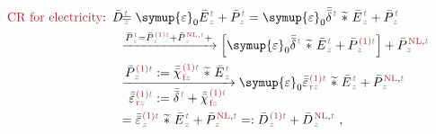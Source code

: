 \begin{subequations} \label{eq:cr-d}
\begin{align}
	\textcolor{Maroon}{\text{CR for electricity}}\text{:}&\hspace{0.5em} \bar{D}^{\;\!\textcolor{gray}{t}}_{\;\!\textcolor{gray}{z}} \hspace{-2.0em} &&= {\symup{\varepsilon}}_0 \bar{E}^{\;\!\textcolor{gray}{t}}_{\;\!\textcolor{gray}{z}} + \bar{P}^{\;\!\textcolor{gray}{t}}_{\;\!\textcolor{gray}{z}} = {\symup{\varepsilon}}_0 \bar{\bar{\delta}}^{\;\!\textcolor{gray}{t}}~\widetilde *~\bar{E}^{\;\!\textcolor{gray}{t}}_{\;\!\textcolor{gray}{z}} + \bar{P}^{\;\!\textcolor{gray}{t}}_{\;\!\textcolor{gray}{z}} \label{cr-d1} \\ & &&\xrightarrow[]{\bar{P}^{\;\!\textcolor{gray}{t}}_{\;\!\textcolor{gray}{z}} = \bar{P}^{\;\!\textcolor{Maroon}{\text{(1)}} \textcolor{gray}{t}}_{\;\!\textcolor{gray}{z}} + \bar{P}^{\;\!\textcolor{Maroon}{\text{NL}}, \textcolor{gray}{t}}_{\;\!\textcolor{gray}{z}} + } \left[ {\symup{\varepsilon}}_0 \bar{\bar{\delta}}^{\;\!\textcolor{gray}{t}}~\widetilde *~\bar{E}^{\;\!\textcolor{gray}{t}}_{\;\!\textcolor{gray}{z}} + \bar{P}^{\;\!\textcolor{Maroon}{\text{(1)}} \textcolor{gray}{t}}_{\;\!\textcolor{gray}{z}} \right] + \bar{P}^{\;\!\textcolor{Maroon}{\text{NL}}, \textcolor{gray}{t}}_{\;\!\textcolor{gray}{z}} \label{cr-d2} \\ & &&\xrightarrow[\displaystyle{ \bar{\bar{\varepsilon}}^{\;\!\textcolor{Maroon}{\text{(1)}} \textcolor{gray}{t}}_{\;\!\textcolor{Maroon}{\text{r}}\textcolor{gray}{z}} := \bar{\bar{\delta}}^{\;\!\textcolor{gray}{t}} + \bar{\bar{\chi}}^{\;\!\textcolor{Maroon}{\text{(1)}}\textcolor{gray}{t}}_{\;\!\textcolor{Maroon}{\text{f}} \textcolor{gray}{z}}}]{\displaystyle{\bar{P}^{\;\!\textcolor{Maroon}{\text{(1)}} \textcolor{gray}{t}}_{\;\!\textcolor{gray}{z}} := \bar{\bar{\chi}}^{\;\!\textcolor{Maroon}{\text{(1)}}\textcolor{gray}{t}}_{\;\!\textcolor{Maroon}{\text{f}} \textcolor{gray}{z}} ~\widetilde *~\bar{E}^{\;\!\textcolor{gray}{t}}_{\;\!\textcolor{gray}{z}}}} {\symup{\varepsilon}}_0 \bar{\bar{\varepsilon}}^{\;\!\textcolor{Maroon}{\text{(1)}} \textcolor{gray}{t}}_{\;\!\textcolor{Maroon}{\text{r}}\textcolor{gray}{z}}~\widetilde *~\bar{E}^{\;\!\textcolor{gray}{t}}_{\;\!\textcolor{gray}{z}} + \bar{P}^{\;\!\textcolor{Maroon}{\text{NL}}, \textcolor{gray}{t}}_{\;\!\textcolor{gray}{z}} \label{cr-d3} \\ & &&= \bar{\bar{\varepsilon}}^{\;\!\textcolor{Maroon}{\text{(1)}} \textcolor{gray}{t}}_{\;\!\textcolor{gray}{z}}~\widetilde *~\bar{E}^{\;\!\textcolor{gray}{t}}_{\;\!\textcolor{gray}{z}} + \bar{P}^{\;\!\textcolor{Maroon}{\text{NL}}, \textcolor{gray}{t}}_{\;\!\textcolor{gray}{z}} =: \bar{D}^{\;\!\textcolor{Maroon}{\text{(1)}} \textcolor{gray}{t}}_{\;\!\textcolor{gray}{z}} + \bar{D}^{\;\!\textcolor{Maroon}{\text{NL}}, \textcolor{gray}{t}}_{\;\!\textcolor{gray}{z}}~, \label{cr-d4}
\end{align}
\end{subequations}
